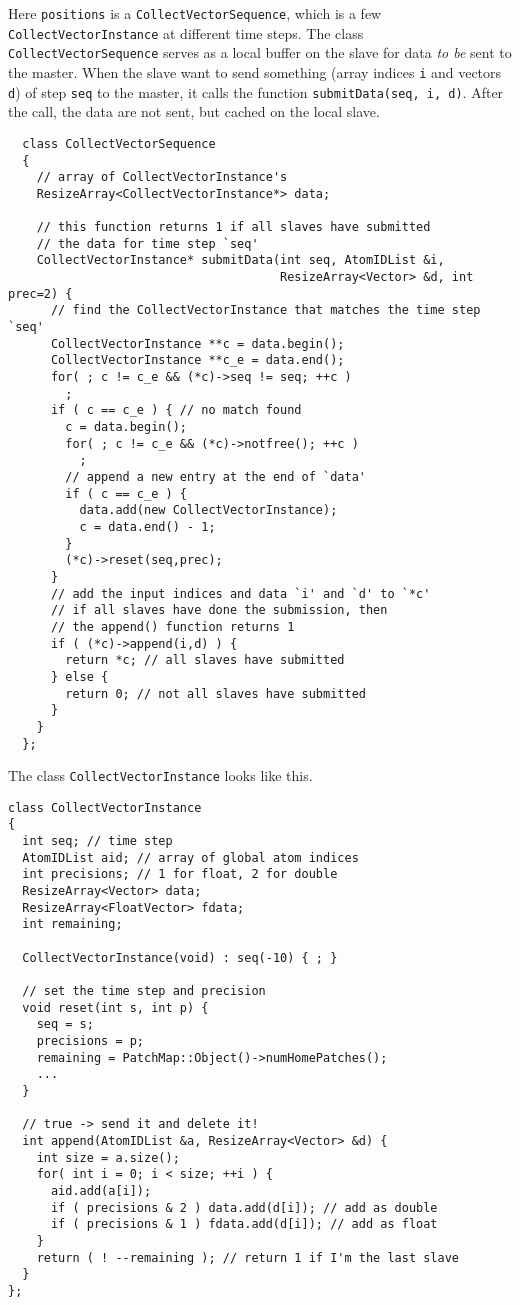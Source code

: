 \documentclass{article}
\begin{document}
Here \texttt{positions} is a \texttt{CollectVectorSequence},
which is a few \texttt{CollectVectorInstance}
at different time steps.
%
The class \texttt{CollectVectorSequence} serves
as a local buffer on the slave for data
\emph{to be} sent to the master.
%
When the slave want to send something
(array indices \texttt{i} and vectors \texttt{d})
of step \texttt{seq} to the master,
it calls the function \texttt{submitData(seq, i, d)}.
%
After the call, the data are not sent,
but cached on the local slave.


\begin{lstlisting}
  class CollectVectorSequence
  {
    // array of CollectVectorInstance's
    ResizeArray<CollectVectorInstance*> data;

    // this function returns 1 if all slaves have submitted
    // the data for time step `seq'
    CollectVectorInstance* submitData(int seq, AtomIDList &i,
                                      ResizeArray<Vector> &d, int prec=2) {
      // find the CollectVectorInstance that matches the time step `seq'
      CollectVectorInstance **c = data.begin();
      CollectVectorInstance **c_e = data.end();
      for( ; c != c_e && (*c)->seq != seq; ++c )
        ;
      if ( c == c_e ) { // no match found
        c = data.begin();
        for( ; c != c_e && (*c)->notfree(); ++c )
          ;
        // append a new entry at the end of `data'
        if ( c == c_e ) {
          data.add(new CollectVectorInstance);
          c = data.end() - 1;
        }
        (*c)->reset(seq,prec);
      }
      // add the input indices and data `i' and `d' to `*c'
      // if all slaves have done the submission, then
      // the append() function returns 1
      if ( (*c)->append(i,d) ) {
        return *c; // all slaves have submitted
      } else {
        return 0; // not all slaves have submitted
      }
    }
  };
\end{lstlisting}

The class \texttt{CollectVectorInstance} looks like this.

\begin{lstlisting}
class CollectVectorInstance
{
  int seq; // time step
  AtomIDList aid; // array of global atom indices
  int precisions; // 1 for float, 2 for double
  ResizeArray<Vector> data;
  ResizeArray<FloatVector> fdata;
  int remaining;

  CollectVectorInstance(void) : seq(-10) { ; }

  // set the time step and precision
  void reset(int s, int p) {
    seq = s;
    precisions = p;
    remaining = PatchMap::Object()->numHomePatches();
    ...
  }

  // true -> send it and delete it!
  int append(AtomIDList &a, ResizeArray<Vector> &d) {
    int size = a.size();
    for( int i = 0; i < size; ++i ) {
      aid.add(a[i]);
      if ( precisions & 2 ) data.add(d[i]); // add as double
      if ( precisions & 1 ) fdata.add(d[i]); // add as float
    }
    return ( ! --remaining ); // return 1 if I'm the last slave
  }
};
\end{lstlisting}
\end{document}
